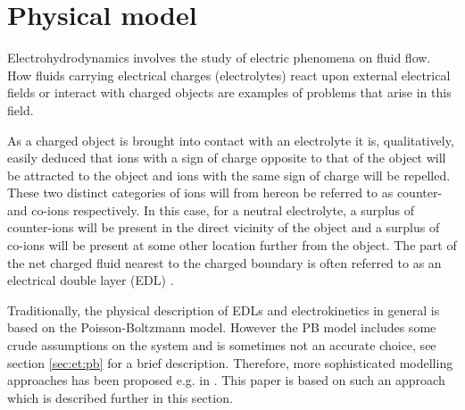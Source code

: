 \section{Physical model}\label{sec:pm}

Electrohydrodynamics involves the study of electric phenomena on fluid
flow. How fluids carrying electrical charges (electrolytes) react upon
external electrical fields or interact with charged objects are
examples of problems that arise in this field. 

As a charged object is brought into contact with an electrolyte it is,
qualitatively, easily deduced that ions with a sign of charge opposite
to that of the object will be attracted to the object and ions with
the same sign of charge will be repelled. These two distinct
categories of ions will from hereon be referred to as counter- and
co-ions respectively. In this case, for a neutral electrolyte, a
surplus of counter-ions will be present in the direct vicinity of the
object and a surplus of co-ions will be present at some other location
further from the object. The part of the net charged fluid nearest to
the charged boundary is often referred to as an electrical double
layer (EDL) \cite{dongquing-ren-book}. 

Traditionally, the physical description of EDLs and electrokinetics in
general is based on the Poisson-Boltzmann model. However the PB model
includes some crude assumptions on the system and is sometimes not an
accurate choice, see section \ref{sec:et:pb} for a brief
description. Therefore, more sophisticated modelling approaches has
been proposed e.g. in \cite{}. This paper is based on such an approach
which is described further in this section.





















